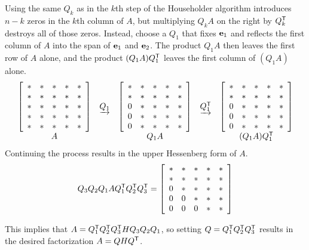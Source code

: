 Using the same $Q_k$ as in the $k$th step of the Householder algorithm introduces $n - k$ zeros in the $k$th column of $A$, but multiplying $Q_k A$ on the right by $Q_k^{\mathsf T}$ destroys all of those zeros.
Instead, choose a $Q_1$ that fixes $\mathbf{e}_1$ and reflects the first column of $A$ into the span of $\mathbf{e}_1$ and $\mathbf{e}_2$.
The product $Q_1A$ then leaves the first row of $A$ alone, and the product $(Q_1A)Q_1^{\mathsf T}$ leaves the first column of $(Q_1A)$ alone.
\[
\begin{array}{ccccc}
\left[\begin{array}{ccccc}
* & * & * & * & * \\
* & * & * & * & * \\
* & * & * & * & * \\
* & * & * & * & * \\
* & * & * & * & *
\end{array}\right]
&\underrightarrow{Q_1}&
\left[\begin{array}{ccccc}
* & * & * & * & * \\
* & * & * & * & * \\
0 & * & * & * & * \\
0 & * & * & * & * \\
0 & * & * & * & *
\end{array}\right]
&\underrightarrow{Q_1^{\mathsf T}}&
\left[\begin{array}{ccccc}
* & * & * & * & * \\
* & * & * & * & * \\
0 & * & * & * & * \\
0 & * & * & * & * \\
0 & * & * & * & *
\end{array}\right]
\\
A & & Q_1A & & (Q_1 A) Q_1^{\mathsf T}
\end{array}
\]
Continuing the process results in the upper Hessenberg form of $A$.
%
\begin{equation*}
Q_3 Q_2 Q_1 A Q_1^{\mathsf T} Q_2 ^{\mathsf T} Q_3^{\mathsf T} =
\left[\begin{array}{ccccc}
* & * & * & * & * \\
* & * & * & * & * \\
0 & * & * & * & * \\
0 & 0 & * & * & * \\
0 & 0 & 0 & * & *
\end{array}\right]
\end{equation*}

This implies that $A = Q_1^{\mathsf T} Q_2^{\mathsf T} Q_3^{\mathsf T} H Q_3 Q_2 Q_1$, so setting $Q = Q_1^{\mathsf T} Q_2^{\mathsf T} Q_3^{\mathsf T}$ results in the desired factorization $A = QHQ^{\mathsf T}$.

